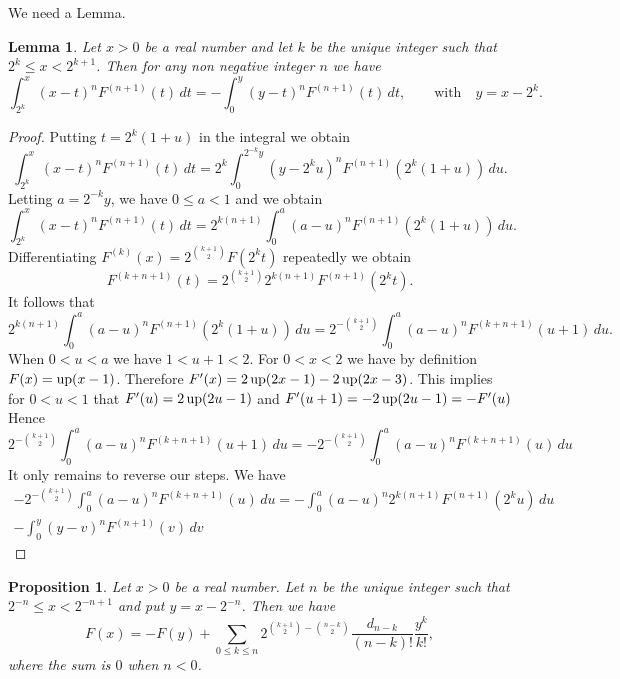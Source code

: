 \documentclass[10pt]{amsart}
\newtheorem{prop}[thm]{Proposition}
\newtheorem{lem}{Lemma}
\theoremstyle{definition}
\theoremstyle{remark}
\begin{document}
We need a Lemma.
\begin{lem}\label{L:taylor}
Let $x>0$ be a real number and let  $k$ be the unique integer such that $2^k\le x<2^{k+1}$. Then for any
non negative integer $n$ we have
\begin{equation}
\int_{2^k}^x(x-t)^nF^{(n+1)}(t)\,dt=-\int_0^{y}(y-t)^n F^{(n+1)}(t)\,dt,\qquad \text{with}\quad y=x-2^k.
\end{equation}
\end{lem}

\begin{proof}
Putting $t=2^k(1+u)$ in the integral we obtain
\[\int_{2^k}^x(x-t)^nF^{(n+1)}(t)\,dt=2^k\int_{0}^{2^{-k}y}(y-2^k u)^nF^{(n+1)}(2^k(1+u))\,du.\]
Letting $a=2^{-k}y$, we have $0\le a<1$  and we obtain
\[\int_{2^k}^x(x-t)^nF^{(n+1)}(t)\,dt=2^{k(n+1)}\int_{0}^{a}(a-u)^nF^{(n+1)}(2^k(1+u))\,du.\]
Differentiating $F^{(k)}(x)=2^{\binom{k+1}{2}}F(2^k t)$ repeatedly we obtain
\[F^{(k+n+1)}(t)=2^{\binom{k+1}{2}} 2^{k(n+1)}F^{(n+1)}(2^k t).\]
It follows that
\[2^{k(n+1)}\int_{0}^{a}(a-u)^nF^{(n+1)}(2^k(1+u))\,du=2^{-\binom{k+1}{2}}\int_{0}^{a}(a-u)^nF^{(k+n+1)}(u+1)\,du.\]
When $0<u<a$ we have $1<u+1<2$. For $0<x<2$ we have by definition $F(x)=\operatorname{up}(x-1)$.
Therefore $F'(x)=2\operatorname{up}(2x-1)-2\operatorname{up}(2x-3)$. This implies for $0<u<1$ that $F'(u)=2\operatorname{up}(2u-1)$ and $F'(u+1)=-2\operatorname{up}(2u-1)=-F'(u)$
Hence
\[2^{-\binom{k+1}{2}}\int_{0}^{a}(a-u)^nF^{(k+n+1)}(u+1)\,du=-2^{-\binom{k+1}{2}}\int_{0}^{a}(a-u)^nF^{(k+n+1)}(u)\,du\]
It only remains to reverse our steps.  We have
\begin{multline*}
-2^{-\binom{k+1}{2}}\int_{0}^{a}(a-u)^nF^{(k+n+1)}(u)\,du=
-\int_{0}^{a}(a-u)^n 2^{k(n+1)}F^{(n+1)}(2^k u)\,du
\\
-\int_{0}^{y}(y-v)^n F^{(n+1)}(v)\,dv
\end{multline*}

\end{proof}


\begin{prop}\label{P:Res}
Let $x>0$ be a real number. Let  $n$ be the unique integer  such that $2^{-n}\le x< 2^{-n+1}$ and put $y=x-2^{-n}$.
Then we have
\begin{equation}
F(x)=-F(y)+\sum_{0\le k\le n} 2^{\binom{k+1}{2}-\binom{n-k}{2}}\frac{d_{n-k}}{(n-k)!}\frac{y^k}{k!},
\end{equation}
where the sum is $0$ when $n<0$.
\end{prop}
\end{document}
